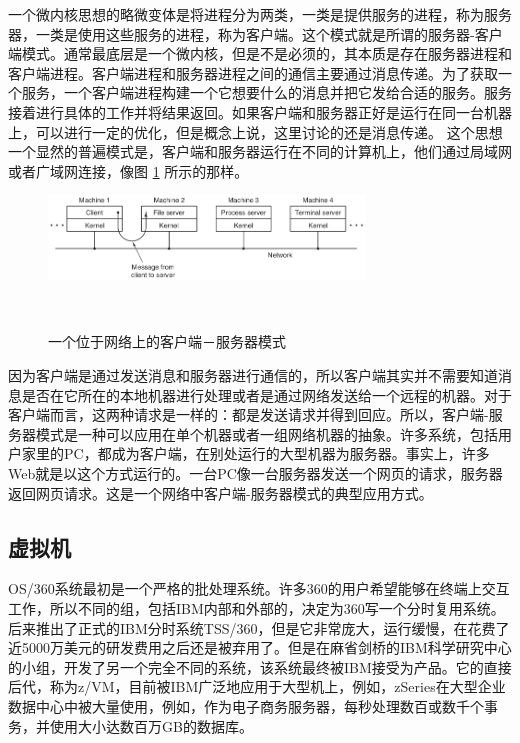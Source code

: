 	一个微内核思想的略微变体是将进程分为两类，一类是提供服务的进程，称为服务器，一类是使用这些服务的进程，称为客户端。这个模式就是所谓的服务器-客户端模式。通常最底层是一个微内核，但是不是必须的，其本质是存在服务器进程和客户端进程。客户端进程和服务器进程之间的通信主要通过消息传递。为了获取一个服务，一个客户端进程构建一个它想要什么的消息并把它发给合适的服务。服务接着进行具体的工作并将结果返回。如果客户端和服务器正好是运行在同一台机器上，可以进行一定的优化，但是概念上说，这里讨论的还是消息传递。
	这个思想一个显然的普遍模式是，客户端和服务器运行在不同的计算机上，他们通过局域网或者广域网连接，像图 \ref{fig:client-server} 所示的那样。
	
    \begin{figure}[ht]\small
		\centering
		\includegraphics[width=0.75\textwidth]{FIG/1-27.png}
		\caption{一个位于网络上的客户端－服务器模式}　\label{fig:client-server}
	\end{figure}

	因为客户端是通过发送消息和服务器进行通信的，所以客户端其实并不需要知道消息是否在它所在的本地机器进行处理或者是通过网络发送给一个远程的机器。对于客户端而言，这两种请求是一样的：都是发送请求并得到回应。所以，客户端-服务器模式是一种可以应用在单个机器或者一组网络机器的抽象。许多系统，包括用户家里的PC，都成为客户端，在别处运行的大型机器为服务器。事实上，许多Web就是以这个方式运行的。一台PC像一台服务器发送一个网页的请求，服务器返回网页请求。这是一个网络中客户端-服务器模式的典型应用方式。

	\subsection{虚拟机}
	
	OS/360系统最初是一个严格的批处理系统。许多360的用户希望能够在终端上交互工作，所以不同的组，包括IBM内部和外部的，决定为360写一个分时复用系统。后来推出了正式的IBM分时系统TSS/360，但是它非常庞大，运行缓慢，在花费了近5000万美元的研发费用之后还是被弃用了。但是在麻省剑桥的IBM科学研究中心的小组，开发了另一个完全不同的系统，该系统最终被IBM接受为产品。它的直接后代，称为z/VM，目前被IBM广泛地应用于大型机上，例如，zSeries在大型企业数据中心中被大量使用，例如，作为电子商务服务器，每秒处理数百或数千个事务，并使用大小达数百万GB的数据库。
	
